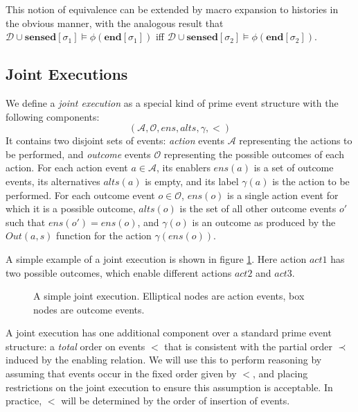 This notion of equivalence can be extended by macro expansion to histories
in the obvious manner, with the analogous result that $\mathcal{D}\cup\mathbf{sensed}[\sigma_{1}]\models\phi(\mathbf{end}[\sigma_{1}])$
iff $\mathcal{D}\cup\mathbf{sensed}[\sigma_{2}]\models\phi(\mathbf{end}[\sigma_{2}])$.


\subsection{Joint Executions}

We define a \emph{joint execution} as a special kind of prime event
structure with the following components:\[
(\mathcal{A},\mathcal{O},ens,alts,\gamma,<)\]
 It contains two disjoint sets of events: \emph{action} events $\mathcal{A}$
representing the actions to be performed, and \emph{outcome} events
$\mathcal{O}$ representing the possible outcomes of each action.
For each action event $a\in\mathcal{A}$, its enablers $ens(a)$ is
a set of outcome events, its alternatives $alts(a)$ is empty, and
its label $\gamma(a)$ is the action to be performed. For each outcome
event $o\in\mathcal{O}$, $ens(o)$ is a single action event for which
it is a possible outcome, $alts(o)$ is the set of all other outcome
events $o'$ such that $ens(o')=ens(o)$, and $\gamma(o)$ is an outcome
as produced by the $Out(a,s)$ function for the action $\gamma(ens(o))$.

A simple example of a joint execution is shown in figure \ref{fig:example-je}.
Here action $act1$ has two possible outcomes, which enable different
actions $act2$ and $act3$.

%
\begin{figure}

\caption{ A simple joint execution. Elliptical nodes are action events, box
nodes are outcome events. }


\label{fig:example-je} 
\end{figure}


A joint execution has one additional component over a standard prime
event structure: a \emph{total} order on events $<$ that is consistent
with the partial order $\prec$ induced by the enabling relation.
We will use this to perform reasoning by assuming that events occur
in the fixed order given by $<$, and placing restrictions on the
joint execution to ensure this assumption is acceptable. In practice,
$<$ will be determined by the order of insertion of events.


